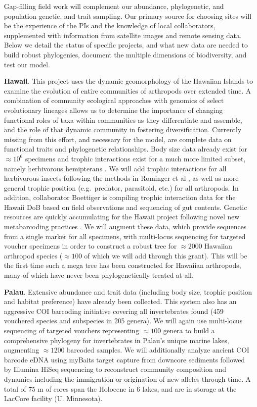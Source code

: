 \documentclass[11pt]{article}
\begin{document}
Gap-filling field work will complement our abundance, phylogenetic,
and population genetic, and trait sampling. Our primary source for
choosing sites will be the experience of the PIs and the knowledge of
local collaborators, supplemented with information from satellite
images and remote sensing data. Below we detail the status of specific
projects, and what new data are needed to build robust phylogenies,
document the multiple dimensions of biodiversity, and test our model.

\textbf{Hawaii}. This project uses the dynamic geomorphology of the
Hawaiian Islands to examine the evolution of entire communities of
arthropods over extended time. A combination of community ecological
approaches with genomics of select evolutionary lineages allows us to
determine the importance of changing functional roles of taxa within
communities as they differentiate and assemble, and the role of that
dynamic community in fostering diversification. Currently missing from
this effort, and necessary for the model, are complete data on
functional traits and phylogenetic relationships. Body size data
already exist for $\approx 10^6$ specimens and trophic interactions
exist for a much more limited subset, namely herbivorous hemipterans
\cite{Rominger2015-kb}. We will add trophic interactions for all
herbivorous insects following the methods in Rominger et al
\cite{Rominger2015-kb}, as well as more general trophic position
(e.g.~predator, parasitoid, etc.) for all arthropods. In addition,
collaborator Boettiger is compiling trophic interaction data for the
Hawaii DoB based on field observations and sequencing of gut contents.
Genetic resources are quickly accumulating for the Hawaii project
following novel new metabarcoding practices
\cite{Krehenwinkel2017-zk}. We will augment these data, which provide
sequences from a single marker for all specimens, with multi-locus
sequencing for targeted voucher specimens in order to construct a
robust tree for $\approx 2000$ Hawaiian arthropod species
($\approx 100$ of which we will add through this grant). This will be
the first time such a mega tree has been constructed for Hawaiian
arthropods, many of which have never been phylogenetically treated at
all.

\textbf{Palau}. Extensive abundance and trait data (including body
size, trophic position and habitat preference) have already been
collected. This system also has an aggressive COI barcoding initiative
covering all invertebrates found (459 vouchered species and subspecies
in 205 genera). We will again use multi-locus sequencing of targeted
vouchers representing $\approx 100$ genera to build a comprehensive
phylogeny for invertebrates in Palau's unique marine lakes, augmenting
$\approx 1200$ barcoded samples. We will additionally analyze ancient
COI barcode eDNA using myBaits target capture from downcore sediments
followed by Illumina HiSeq sequencing to reconstruct community
composition and dynamics including the immigration or origination of
new alleles through time. A total of 75 m of cores span the Holocene
in 6 lakes, and are in storage at the LacCore facility (U. Minnesota).
\end{document}
